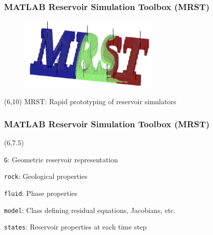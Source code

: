 \documentclass[screen, aspectratio=43]{beamer}
\newcommand{\myitemmark}{\raisebox{.75ex}{\scalebox{.6}{\protect\colorbox{ntnublue}{\protect}}}}
\newenvironment{prettyList}
{
  \begin{list}{\myitemmark}{\leftmargin=1.5em \itemindent=0em} 
}
{
  \end{list}
}
\begin{document}
{
\begin{frame}
  \frametitle{MATLAB Reservoir Simulation Toolbox (MRST)}
  
    \begin{figure}[h]
      \centering
      \vspace{-4em}\hspace{8em}\includegraphics[width = 0.6\textwidth]{figures/misc/mrstlogo}
    \end{figure}
     \begin{textblock}{9.5}(6,10)
    MRST: Rapid prototyping of reservoir simulators \cite{krogstad2015mrst}
  \end{textblock}

\end{frame}
}

{
\begin{frame}
  \frametitle{MATLAB Reservoir Simulation Toolbox (MRST)}
  
  \begin{textblock}{9.5}(6,7.5)
    \begin{prettyList}
    \item \texttt{G}: Geometric reservoir representation
    \item \texttt{rock}: Geological properties
    \item \texttt{fluid}: Phase properties
    \item \texttt{model}: Class defining residual equations, Jacobians, etc.
    \item \texttt{states}: Reservoir properties at each time step
    \end{prettyList}
  \end{textblock}

\end{frame}
}
\end{document}
